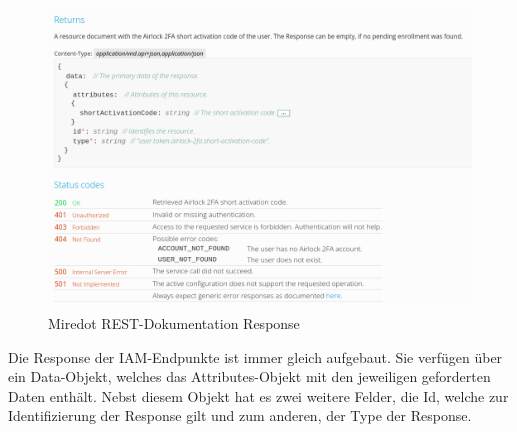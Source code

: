 \begin{figure}[H]
	\begin{center}
		\includegraphics[width=1.0\textwidth]{ressourcen/responsedoc}
		\caption[REST-Dokumentation Response]{Miredot REST-Dokumentation Response}\label{fig:responsedoc}
	\end{center}
\end{figure}
\noindent Die Response der IAM-Endpunkte ist immer gleich aufgebaut. Sie verfügen über ein Data-Objekt, welches das Attributes-Objekt mit den jeweiligen geforderten Daten enthält. Nebst diesem Objekt hat es zwei weitere Felder, die Id, welche zur Identifizierung der Response gilt und zum anderen, der Type der Response. 
